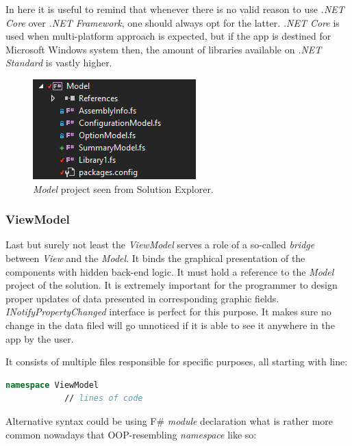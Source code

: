         In here it is useful to remind that whenever there is no valid reason to use \textit{.NET Core} over \textit{.NET Framework}, one should always opt for the latter. \textit{.NET Core} is used when multi-platform approach is expected, but if the app is destined for Microsoft Windows system then, the amount of libraries available on \textit{.NET Standard} is vastly higher.
        
        \begin{figure}[H]
            \centering
            \includegraphics{img/model.png}
            \caption{\textit{Model} project seen from Solution Explorer.}
            \label{fig:model}
        \end{figure} 
        
    \subsubsection{ViewModel}    
        Last but surely not least the \textit{ViewModel} serves a role of a so-called \textit{bridge} between \textit{View} and the \textit{Model}. It binds the graphical presentation of the components with hidden back-end logic. It must hold a reference to the \textit{Model} project of the solution. It is extremely important for the programmer to design proper updates of data presented in corresponding graphic fields. \textit{INotifyPropertyChanged} interface is perfect for this purpose. It makes sure no change in the data filed will go unnoticed if it is able to see it anywhere in the app by the user.
        
        It consists of multiple files responsible for specific purposes, all starting with line:
        
        \begin{lstlisting}[language=FSharp, label={lst:model1}, caption=F\# all \textit{ViewModel} project components beginning.]
            namespace ViewModel
            // lines of code
        \end{lstlisting}
        
        Alternative syntax could be using F\# \textit{module} declaration what is rather more common nowadays that OOP-resembling \textit{namespace} like so:
        
